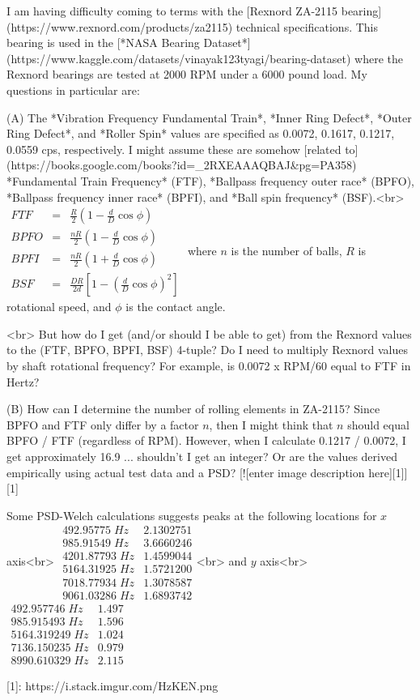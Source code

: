 I am having difficulty coming to terms with the [Rexnord ZA-2115 bearing](https://www.rexnord.com/products/za2115) technical specifications. This bearing is used in the [*NASA Bearing Dataset*](https://www.kaggle.com/datasets/vinayak123tyagi/bearing-dataset) where the Rexnord bearings are tested at 2000 RPM under a 6000 pound load. My questions in particular are:

(A) The *Vibration Frequency Fundamental Train*, *Inner Ring Defect*, *Outer Ring Defect*, and *Roller Spin* values are specified as 0.0072, 0.1617, 0.1217, 0.0559 cps, respectively. I might assume these are somehow [related to](https://books.google.com/books?id=_2RXEAAAQBAJ&pg=PA358) *Fundamental Train Frequency* (FTF), *Ballpass frequency outer race* (BPFO), *Ballpass frequency inner race* (BPFI), and *Ball spin frequency* (BSF).<br>
$\begin{array}{lcl|}
FTF &=&\frac{R}{2}\left(1-\frac{d}{D}\cos\phi\right)\\
BPFO&=&\frac{nR}{2}\left(1-\frac{d}{D}\cos\phi\right)\\
BPFI&=&\frac{nR}{2}\left(1+\frac{d}{D}\cos\phi\right)\\
BSF &=&\frac{DR}{2d}\left[1-\left(\frac{d}{D}\cos\phi\right)^2\right]
\end{array}$
where $n$ is the number of balls, $R$ is rotational speed, and $\phi$ is the contact angle.


<br>
But how do I get (and/or should I be able to get) from the Rexnord values to the (FTF, BPFO, BPFI, BSF) 4-tuple? Do I need to multiply Rexnord values by shaft rotational frequency? For example, is 0.0072 x RPM/60 equal to FTF in Hertz?

(B) How can I determine the number of rolling elements in ZA-2115? Since BPFO and FTF only differ by a factor $n$, then I might think that $n$ should equal BPFO / FTF (regardless of RPM). However, when I calculate 0.1217 / 0.0072, I get approximately  16.9 ... shouldn't I get an integer? Or are the values derived empirically using actual test data and a PSD?
[![enter image description here][1]][1]

Some PSD-Welch calculations suggests peaks at the following locations for $x$ axis<br>
$\begin{array}{cc}
  492.95775 \;Hz& 2.1302751\\
  985.91549 \;Hz& 3.6660246\\
 4201.87793 \;Hz& 1.4599044\\
 5164.31925 \;Hz& 1.5721200\\
 7018.77934 \;Hz& 1.3078587\\
 9061.03286 \;Hz& 1.6893742
\end{array}$<br>
and $y$ axis<br>
$\begin{array}{cc}
  492.957746  \;Hz&  1.497\\
  985.915493  \;Hz&  1.596\\
  5164.319249 \;Hz&  1.024\\
  7136.150235 \;Hz&  0.979\\
  8990.610329 \;Hz&  2.115
\end{array}$

  [1]: https://i.stack.imgur.com/HzKEN.png